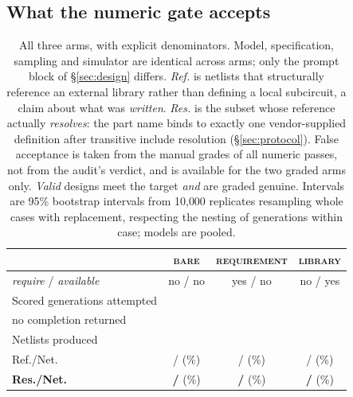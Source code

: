 \subsection{What the numeric gate accepts}
\label{sec:arms}

\begin{table}[tb]
\centering
\caption{All three arms, with explicit denominators. Model, specification,
  sampling and simulator are identical across arms; only the prompt block of
  \S\ref{sec:design} differs. \emph{Ref.} is netlists that structurally
  reference an external library rather than defining a local subcircuit, a
  claim about what was \emph{written}. \emph{Res.} is the subset whose
  reference actually \emph{resolves}: the part name binds to exactly one
  vendor-supplied definition after transitive include resolution
  (\S\ref{sec:protocol}). False acceptance is taken from the manual grades of
  all \NumNumericPass{} numeric passes, not from the audit's verdict, and is
  available for the two graded arms only. \emph{Valid} designs meet the target
  \emph{and} are graded genuine. Intervals are 95\% bootstrap intervals from
  10{,}000 replicates resampling whole cases with replacement, respecting the
  nesting of generations within case; models are pooled.}
\label{tab:main}
\small
\setlength{\tabcolsep}{4pt}
\begin{tabular}{@{}lccc@{}}
\toprule
 & \textbf{\textsc{bare}} & \textbf{\textsc{requirement}} & \textbf{\textsc{library}} \\
\midrule
\emph{require} / \emph{available} & no / no & yes / no & no / yes \\
\midrule
Scored generations attempted & \FactBareAtt{} & \FactRequirementAtt{} & \FactLibraryAtt{} \\
\quad no completion returned & \FactBareNoComp{} & \FactRequirementNoComp{} & \FactLibraryNoComp{} \\
Netlists produced            & \FactBareNet{} & \FactRequirementNet{} & \FactLibraryNet{} \\
\midrule
Ref./Net.  & \FactBareRef{}/\FactBareNet{} (\FactBareRefRate{}\%)
           & \FactRequirementRef{}/\FactRequirementNet{} (\FactRequirementRefRate{}\%)
           & \FactLibraryRef{}/\FactLibraryNet{} (\FactLibraryRefRate{}\%) \\
\textbf{Res./Net.} & \textbf{\FactBareRes{}/\FactBareNet{}} (\FactBareResRate{}\%)
           & \textbf{\FactRequirementRes{}/\FactRequirementNet{}} (\FactRequirementResRate{}\%)
           & \textbf{\FactLibraryRes{}/\FactLibraryNet{}} (\FactLibraryResRate{}\%) \\

\end{tabular}
\end{table}

